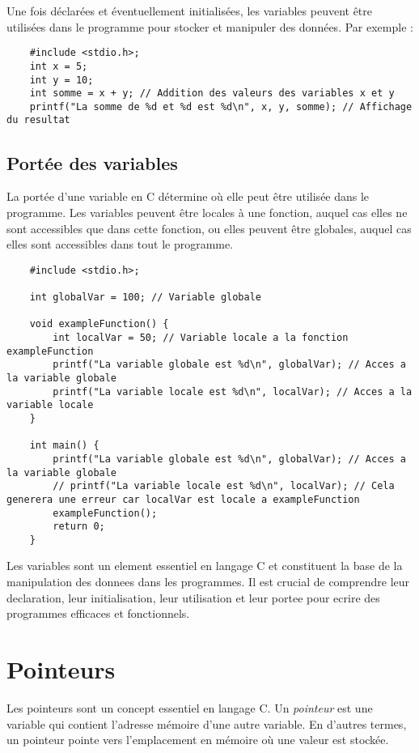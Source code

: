 Une fois déclarées et éventuellement initialisées, les variables peuvent être utilisées dans le programme pour stocker et manipuler des données. Par exemple :

\begin{lstlisting}
	#include <stdio.h>;
	int x = 5;
	int y = 10;
	int somme = x + y; // Addition des valeurs des variables x et y
	printf("La somme de %d et %d est %d\n", x, y, somme); // Affichage du resultat
\end{lstlisting}

\subsection{Portée des variables}

La portée d'une variable en C détermine où elle peut être utilisée dans le programme. Les variables peuvent être locales à une fonction, auquel cas elles ne sont accessibles que dans cette fonction, ou elles peuvent être globales, auquel cas elles sont accessibles dans tout le programme.

\begin{lstlisting}
	#include <stdio.h>;
	
	int globalVar = 100; // Variable globale
	
	void exampleFunction() {
		int localVar = 50; // Variable locale a la fonction exampleFunction
		printf("La variable globale est %d\n", globalVar); // Acces a la variable globale
		printf("La variable locale est %d\n", localVar); // Acces a la variable locale
	}
	
	int main() {
		printf("La variable globale est %d\n", globalVar); // Acces a la variable globale
		// printf("La variable locale est %d\n", localVar); // Cela generera une erreur car localVar est locale a exampleFunction
		exampleFunction();
		return 0;
	}
\end{lstlisting}

Les variables sont un element essentiel en langage C et constituent la base de la manipulation des donnees dans les programmes. Il est crucial de comprendre leur declaration, leur initialisation, leur utilisation et leur portee pour ecrire des programmes efficaces et fonctionnels.


\section{Pointeurs}

Les pointeurs sont un concept essentiel en langage C. Un \emph{pointeur} est une variable qui contient l'adresse mémoire d'une autre variable. En d'autres termes, un pointeur pointe vers l'emplacement en mémoire où une valeur est stockée.

